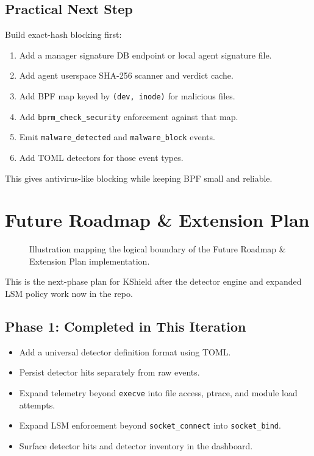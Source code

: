 \documentclass[
  12pt,
]{report}
\providecommand{\tightlist}{%
  \setlength{\itemsep}{0pt}\setlength{\parskip}{0pt}}
\begin{document}
\section{Practical Next Step}\label{practical-next-step}

Build exact-hash blocking first:

\begin{enumerate}
\def\labelenumi{\arabic{enumi}.}
\tightlist
\item
  Add a manager signature DB endpoint or local agent signature file.
\item
  Add agent userspace SHA-256 scanner and verdict cache.
\item
  Add BPF map keyed by \texttt{(dev,\ inode)} for malicious files.
\item
  Add \texttt{bprm\_check\_security} enforcement against that map.
\item
  Emit \texttt{malware\_detected} and \texttt{malware\_block} events.
\item
  Add TOML detectors for those event types.
\end{enumerate}

This gives antivirus-like blocking while keeping BPF small and reliable.

\clearpage

\chapter{Future Roadmap \& Extension
Plan}\label{future-roadmap-extension-plan}

\begin{figure}[h]
\centering
\vspace{5cm}
\caption{Illustration mapping the logical boundary of the Future Roadmap & Extension Plan implementation.}
\end{figure}

This is the next-phase plan for KShield after the detector engine and
expanded LSM policy work now in the repo.

\section{Phase 1: Completed in This
Iteration}\label{phase-1-completed-in-this-iteration}

\begin{itemize}
\tightlist
\item
  Add a universal detector definition format using TOML.
\item
  Persist detector hits separately from raw events.
\item
  Expand telemetry beyond \texttt{execve} into file access, ptrace, and
  module load attempts.
\item
  Expand LSM enforcement beyond \texttt{socket\_connect} into
  \texttt{socket\_bind}.
\item
  Surface detector hits and detector inventory in the dashboard.
\end{itemize}
\end{document}
